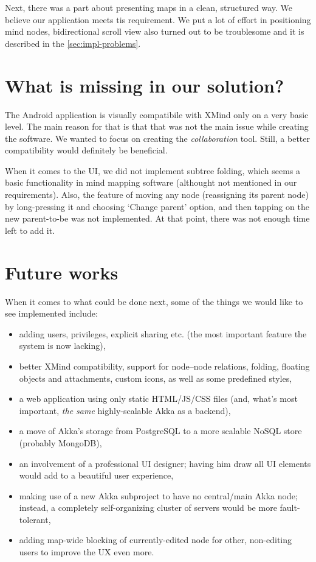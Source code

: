 Next, there was a part about presenting maps in a clean, structured way. We believe our application meets tis requirement. We put a lot of effort in positioning mind nodes, bidirectional scroll view also turned out to be troublesome and it is described in the \cref{sec:impl-problems}.

\section{What is missing in our solution?}
\label{summary-missing}
The Android application is visually compatibile with XMind only on a very basic level. The main reason for that is that that was not the main issue while creating the software. We wanted to focus on creating the \emph{collaboration} tool. Still, a better compatibility would definitely be beneficial. 

When it comes to the UI, we did not implement subtree folding, which seems a basic functionality in mind mapping software (althought not mentioned in our requirements). Also, the feature of moving any node (reassigning its parent node) by long-pressing it and choosing `Change parent' option, and then tapping on the new parent-to-be was not implemented. At that point, there was not enough time left to add it.

\section{Future works}
\label{summary-future}
When it comes to what could be done next, some of the things we would like to see implemented include:

\begin{itemize}
	\item adding users, privileges, explicit sharing etc. (the most important feature the system is now lacking),
	\item better XMind compatibility, support for node--node relations, folding, floating objects and attachments, custom icons, as well as some predefined styles,
	\item a web application using only static HTML/JS/CSS files (and, what's most important, \emph{the same} highly-scalable Akka as a backend),
	\item a move of Akka's storage from PostgreSQL to a more scalable NoSQL store (probably MongoDB),
	\item an involvement of a professional UI designer; having him draw all UI elements would add to a beautiful user experience,
	\item making use of a new  Akka subproject to have no central/main Akka node; instead, a completely self-organizing cluster of servers would be more fault-tolerant,
	\item adding map-wide blocking of currently-edited node for other, non-editing users to improve the UX even more.
\end{itemize}
